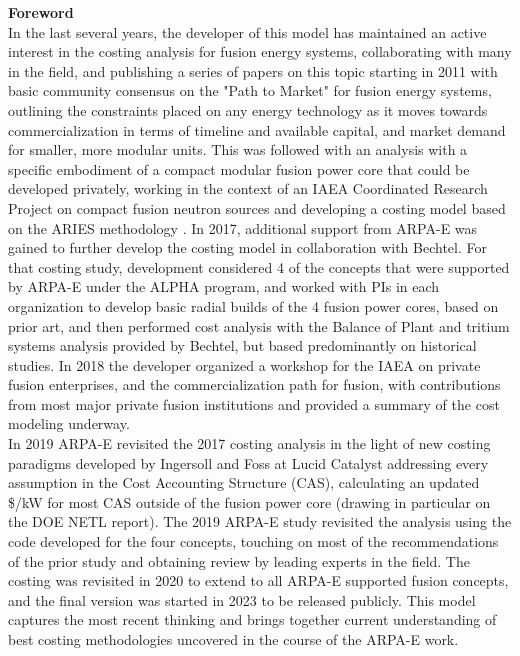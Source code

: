 \textbf{Foreword} \\ 
 
In the last several years, the developer of this model has maintained an active interest in the costing analysis for fusion energy systems, collaborating with many in the field, and publishing a series of papers on this topic starting in 2011 with basic community consensus on the "Path to Market" for fusion energy systems, outlining the constraints placed on any energy technology as it moves towards commercialization in terms of timeline and available capital, and market demand for smaller, more modular units. This was followed with an analysis with a specific embodiment of a compact modular fusion power core that could be developed privately, working in the context of an IAEA Coordinated Research Project on compact fusion neutron sources and developing a costing model based on the ARIES methodology \cite{waganer2006design}. In 2017, additional support from ARPA-E was gained to further develop the costing model in collaboration with Bechtel. For that costing study, development considered 4 of the concepts that were supported by ARPA-E under the ALPHA program, and worked with PIs in each organization to develop basic radial builds of the 4 fusion power cores, based on prior art, and then performed cost analysis with the Balance of Plant and tritium systems analysis provided by Bechtel, but based predominantly on historical studies. In 2018 the developer organized a workshop for the IAEA on private fusion enterprises, and the commercialization path for fusion, with contributions from most major private fusion institutions and provided a summary of the cost modeling underway.\\
 
In 2019 ARPA-E revisited the 2017 costing analysis in the light of new costing paradigms developed by Ingersoll and Foss at Lucid Catalyst addressing every assumption in the Cost Accounting Structure (CAS), calculating an updated \$/kW for most CAS outside of the fusion power core (drawing in particular on the DOE NETL report). The 2019 ARPA-E study revisited the analysis using the code developed for the four concepts, touching on most of the recommendations of the prior study and obtaining review by leading experts in the field. The costing was revisited in 2020 to extend to all ARPA-E supported fusion concepts, and the final version was started in 2023 to be released publicly. This model captures the most recent thinking and brings together current understanding of best costing methodologies uncovered in the course of the ARPA-E work.\\

